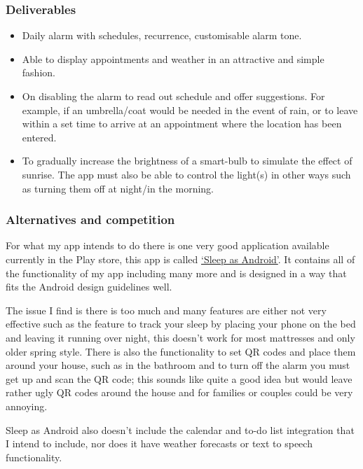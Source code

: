 \subsubsection{Deliverables}\label{deliverables}

\begin{itemize}
\tightlist
\item
  Daily alarm with schedules, recurrence, customisable alarm tone.
\item
  Able to display appointments and weather in an attractive and simple
  fashion.
\item
  On disabling the alarm to read out schedule and offer suggestions. For
  example, if an umbrella/coat would be needed in the event of rain, or
  to leave within a set time to arrive at an appointment where the
  location has been entered.
\item
  To gradually increase the brightness of a smart-bulb to simulate the
  effect of sunrise. The app must also be able to control the light(s)
  in other ways such as turning them off at night/in the morning.
\end{itemize}

\subsubsection{Alternatives and
competition}\label{alternatives-and-competition}

For what my app intends to do there is one very good application
available currently in the Play store, this app is called
\href{https://play.google.com/store/apps/details?id=com.urbandroid.sleep}{`Sleep
as Android'}. It contains all of the functionality of my app including
many more and is designed in a way that fits the Android design
guidelines well.

The issue I find is there is too much and many features are either not
very effective such as the feature to track your sleep by placing your
phone on the bed and leaving it running over night, this doesn't work
for most mattresses and only older spring style. There is also the
functionality to set QR codes and place them around your house, such as
in the bathroom and to turn off the alarm you must get up and scan the
QR code; this sounds like quite a good idea but would leave rather ugly
QR codes around the house and for families or couples could be very
annoying.

Sleep as Android also doesn't include the calendar and to-do list
integration that I intend to include, nor does it have weather forecasts
or text to speech functionality.

